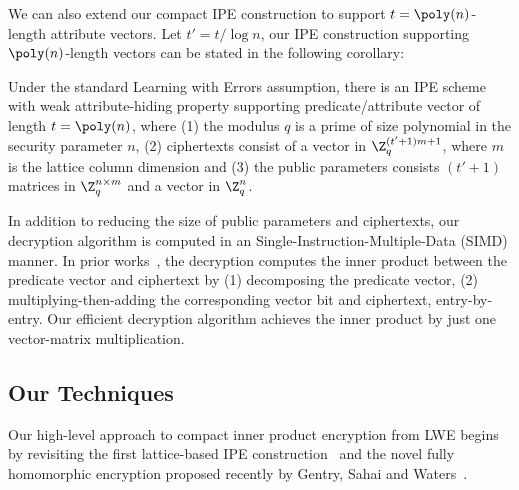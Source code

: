 We can also extend our compact IPE construction to support $t = \poly(n)$-length attribute vectors. Let $t' = t / \log n$, our IPE construction supporting $\poly(n)$-length vectors can be stated in the following corollary:
\begin{cor}\label{cor}
Under the standard Learning with Errors assumption, there is an IPE scheme with weak attribute-hiding property supporting predicate/attribute vector of length $t = \poly(n)$, where (1) the modulus $q$ is a prime of size polynomial in the security parameter $n$, (2) ciphertexts consist of a vector in $\Z_q^{(t' + 1)m + 1}$, where $m$ is the lattice column dimension and (3) the public parameters consists $(t' + 1)$ matrices in $\Z_q^{n \times m}$ and a vector in $\Z_q^n$.
\end{cor}
In addition to reducing the size of public parameters and ciphertexts, our decryption algorithm is computed in an Single-Instruction-Multiple-Data (SIMD) manner. In prior works~\cite{AC:AgrFreVai11,PKC:Xagawa13}, the decryption computes the inner product between the predicate vector and ciphertext by (1) decomposing the predicate vector, (2) multiplying-then-adding the corresponding vector bit and ciphertext, entry-by-entry. Our efficient decryption algorithm achieves the inner product by just one vector-matrix multiplication.

\subsection{Our Techniques}
Our high-level approach to compact inner product encryption from LWE begins by revisiting the first lattice-based IPE construction~\cite{AC:AgrFreVai11} and the novel fully homomorphic encryption proposed recently by Gentry, Sahai and Waters~\cite{C:GenSahWat13}.

